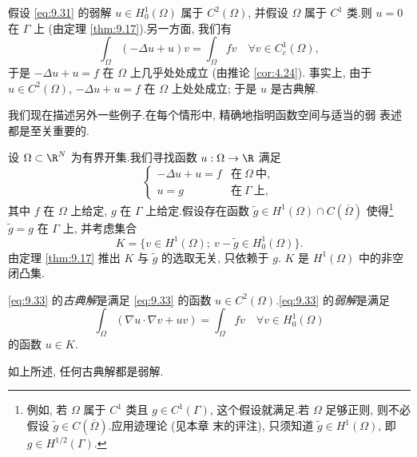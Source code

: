 
假设 \eqref{eq:9.31} 的弱解 $u\in H_0^1(\Omega)$ 属于 $C^2(\Omega)$,
并假设 $\Omega$ 属于 $C^1$ 类.则 $u=0$ 在 $\Gamma$ 上 (由定理
 \ref{thm:9.17}).另一方面, 我们有
\begin{equation*}
\int_\Omega(-\Delta u+u)v=\int_\Omega fv\quad\forall v\in C_c^1(\Omega),
\end{equation*}
于是 $-\Delta u+u=f$ 在 $\Omega$ 上几乎处处成立 (由推论  \ref{cor:4.24}).
事实上, 由于 $u\in C^2(\Omega)$, $-\Delta u+u=f$ 在 $\Omega$ 上处处成立;
于是 $u$ 是古典解.

我们现在描述另外一些例子.在每个情形中, 精确地指明函数空间与适当的弱
表述都是至关重要的.

\begin{example}
\label{ex:9.2}
设 $\Omega\subset\R^N$ 为有界开集.我们寻找函数 $u:\Omega\to\R$ 满足
\begin{equation}
\begin{cases}
-\Delta u+u=f & \text{在}\ \Omega\ \text{中},\\
u=g & \text{在}\ \Gamma\ \text{上},
\end{cases}
\label{eq:9.33}
\end{equation}
其中 $f$ 在 $\Omega$ 上给定, $g$ 在 $\Gamma$ 上给定.假设存在函数
$\tilde g\in H^1(\Omega)\cap C(\overline\Omega)$ 使得\footnote{例如, 若
$\Omega$ 属于 $C^1$ 类且 $g\in C^1(\Gamma)$, 这个假设就满足.若 $\Omega$
足够正则, 则不必假设 $\tilde g\in C(\overline\Omega)$.应用迹理论 (见本章
末的评注), 只须知道 $\tilde g\in H^1(\Omega)$, 即
$g\in H^{1/2}(\Gamma)$.} $\tilde g=g$ 在 $\Gamma$ 上, 并考虑集合
\begin{equation*}
K=\{v\in H^1(\Omega);\ v-\tilde g\in H_0^1(\Omega)\}.
\end{equation*}
由定理  \ref{thm:9.17} 推出 $K$ 与 $\tilde g$ 的选取无关, 只依赖于 $g$.
$K$ 是 $H^1(\Omega)$ 中的非空闭凸集.
\end{example}

\begin{definition}
\eqref{eq:9.33} 的\emph{古典解}是满足 \eqref{eq:9.33} 的函数
$u\in C^2(\Omega)$.\eqref{eq:9.33} 的\emph{弱解}是满足
\begin{equation}
\int_\Omega(\nabla u\cdot\nabla v+uv)=\int_\Omega fv
\quad\forall v\in H_0^1(\Omega)
\label{eq:9.34}
\end{equation}
的函数 $u\in K$.
\end{definition}

如上所述, 任何古典解都是弱解.

